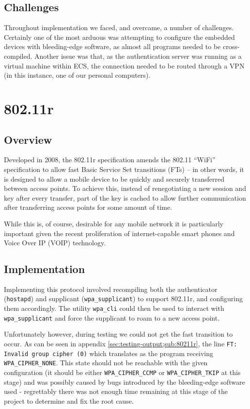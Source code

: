 \documentclass[12pt,a4paper,titlepage]{article}
\begin{document}
\subsection{Challenges}
Throughout implementation we faced, and overcame, a number of challenges. Certainly one of the most arduous was attempting to configure the embedded devices with bleeding-edge software, as almost all programs needed to be cross-compiled. Another issue was that, as the authentication server was running as a virtual machine within ECS, the connection needed to be routed through a VPN (in this instance, one of our personal computers).

\newpage
\section{802.11r}

\subsection{Overview}
Developed in 2008, the 802.11r specification amends the 802.11 ``WiFi'' specification to allow fast Basic Service Set transitions (FTs) -- in other words, it is designed to allow a mobile device to be quickly and securely transferred between access points. To achieve this, instead of renegotiating a new session and key after every transfer, part of the key is cached to allow further communication after transferring access points for some amount of time.

While this is, of course, desirable for any mobile network it is particularly important given the recent proliferation of internet-capable smart phones and Voice Over IP (VOIP) technology.

\subsection{Implementation}
Implementing this protocol involved recompiling both the authenticator (\texttt{hostapd}) and supplicant (\texttt{wpa\_supplicant}) to support 802.11r, and configuring them accordingly. The utility \texttt{wpa\_cli} could then be used to interact with \texttt{wpa\_supplicant} and force the supplicant to roam to a new access point.

Unfortunately however, during testing we could not get the fast transition to occur. As can be seen in appendix \ref{sec:testing-output;sub:80211r}, the line \texttt{FT: Invalid group cipher (0)} which translates as the program receiving \texttt{WPA\_CIPHER\_NONE}. This state should not be reachable with the given configuration (it should be either \texttt{WPA\_CIPHER\_CCMP} or \texttt{WPA\_CIPHER\_TKIP} at this stage) and was possibly caused by bugs introduced by the bleeding-edge software used - regrettably there was not enough time remaining at this stage of the project to determine and fix the root cause.
\end{document}
